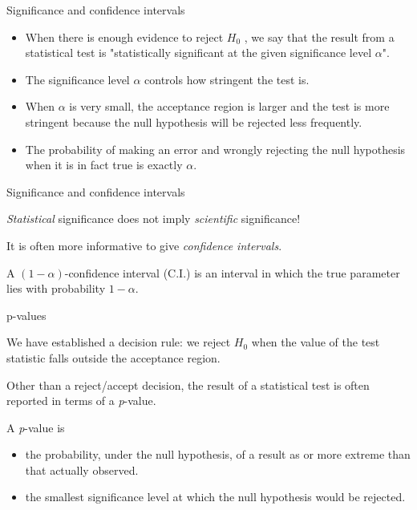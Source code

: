\documentclass{beamer}
\begin{document}
\begin{frame}{Significance and confidence intervals}

	\begin{itemize}
		\item When there is enough evidence to reject $H_0$ , we say that the result
		from a statistical test is "statistically significant at the given
		significance level $\alpha$".
		\item The significance level $\alpha$ controls how stringent the test is. 
		\item When $\alpha$ is very small, the acceptance region is larger and the test is
		more stringent because the null hypothesis will be rejected less frequently.
		\item The probability of making an error and wrongly rejecting the null
		hypothesis when it is in fact true is exactly $\alpha$.
	\end{itemize}

\end{frame}

\begin{frame}{Significance and confidence intervals}

	\begin{block}{}
		\textit{Statistical} significance does not imply \textit{scientific} significance!
	\end{block}

	\vskip 1cm

	It is often more informative to give \textit{confidence intervals}.
	
	A $(1 - \alpha)$-confidence interval (C.I.) is an interval in which the true
	parameter lies with probability $1 - \alpha$.
	
\end{frame}

\begin{frame}{p-values}

	We have established a decision rule: we reject $H_0$ when the value of the
	test statistic falls outside the acceptance region.

	Other than a reject/accept decision, the result of a statistical test is often
	reported in terms of a \textit{p}-value.

	\vskip 0.5cm
	
	A \textit{p}-value is
	\begin{itemize}
		\item the probability, under the null hypothesis, of a result as or more
		extreme than that actually observed.
		\item the smallest significance level at which the null hypothesis would be rejected.
	\end{itemize}

\end{frame}
\end{document}

